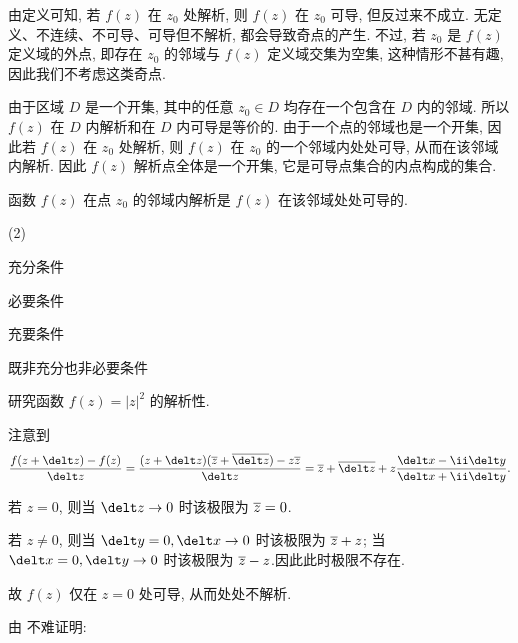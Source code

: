 
由定义可知, 若 $f(z)$ 在 $z_0$ 处解析, 则 $f(z)$ 在 $z_0$ 可导, 但反过来不成立.
无定义、不连续、不可导、可导但不解析, 都会导致奇点的产生.
不过, 若 $z_0$ 是 $f(z)$ 定义域的外点, 即存在 $z_0$ 的邻域与 $f(z)$ 定义域交集为空集, 这种情形不甚有趣, 因此我们不考虑这类奇点.

由于区域 $D$ 是一个开集, 其中的任意 $z_0\in D$ 均存在一个包含在 $D$ 内的邻域. 所以 \alert{$f(z)$ 在 $D$ 内解析和在 $D$ 内可导是等价的}.
由于一个点的邻域也是一个开集, 因此若 $f(z)$ 在 $z_0$ 处解析, 则 $f(z)$ 在 $z_0$ 的一个邻域内处处可导, 从而在该邻域内解析. 因此 \alert{$f(z)$ 解析点全体是一个开集}, 它是可导点集合的内点构成的集合.

\begin{exercise}
  函数 $f(z)$ 在点 $z_0$ 的邻域内解析是 $f(z)$ 在该邻域处处可导的\fillbrace{}.
  \begin{examplechoice}(2)
    \item 充分条件
    \item 必要条件
    \item 充要条件
    \item 既非充分也非必要条件
  \end{examplechoice}
\end{exercise}

\begin{example}
  研究函数 $f(z)=|z|^2$ 的解析性.
\end{example}

\begin{solution}
  注意到
  \[
     \frac{f(z+\delt z)-f(z)}{\delt z}
    =\frac{(z+\delt z)(\ov z+\ov{\delt z})-z\ov z}{\delt z}
    =\ov z+\ov{\delt z}
      +z\frac{\delt x-\ii\delt y}{\delt x+\ii\delt y}.
  \]
  \vspace{-\baselineskip}
  \begin{enumr}
    \item 若 $z=0$, 则当 $\delt z\ra 0$ 时该极限为 $\overline z=0$.
    \item 若 $z\neq0$, 则当 $\delt y=0,\delt x\ra 0$ 时该极限为 $\overline z+z$; 当 $\delt x=0,\delt y\ra 0$ 时该极限为 $\overline z-z$.因此此时极限不存在.
  \end{enumr}
  故 $f(z)$ 仅在 $z=0$ 处可导, 从而处处不解析.
\end{solution}

由 不难证明:

